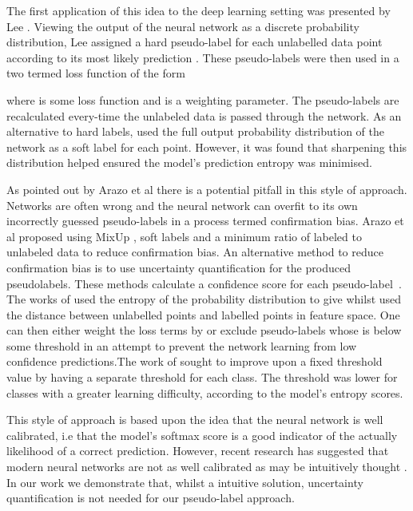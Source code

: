 \documentclass[journal]{IEEEtran}
\begin{document}
The first application of this idea to the deep learning setting was presented by Lee \cite{lee2013pseudo}. Viewing the output of the neural network  as a discrete probability distribution, Lee assigned a hard pseudo-label  for each unlabelled data point according to its most likely prediction . These pseudo-labels were then used in a two termed loss function of the form 

\vspace{-0.4cm}


\noindent
where  is some loss function and  is a weighting parameter. The pseudo-labels are recalculated every-time the unlabeled data is passed through the network. As an alternative to hard labels, \cite{berthelot2019mixmatch} used the full output probability distribution of the network as a soft label for each point. However, it was found that sharpening this distribution helped ensured the model's prediction entropy was minimised. 

As pointed out by Arazo et al \cite{arazo2019pseudo} there is a potential pitfall in this style of approach. Networks are often wrong and the neural network can overfit to its own incorrectly guessed pseudo-labels in a process termed confirmation bias. Arazo et al proposed using MixUp \cite{zhang2017mixup}, soft labels and a minimum ratio of labeled to unlabeled data to reduce confirmation bias. An alternative method to reduce confirmation bias is to use uncertainty quantification for the produced pseudolabels. These methods calculate a confidence score  for each pseudo-label~. The works of  \cite{sohn2020fixmatch,iscen2019label,hu2021simple} used the entropy of the probability distribution to give  whilst \cite{shi2018transductive} used the distance between unlabelled points and labelled points in feature space. One can then either weight the loss terms by  or exclude pseudo-labels whose  is below some threshold  in an attempt to prevent the network learning from low confidence predictions.The work of \cite{zhang2021flexmatch} sought to improve upon a fixed threshold value by having a separate threshold for each class. The threshold was lower for classes with a greater learning difficulty, according to the model's entropy scores.

This style of approach is based upon the idea that the neural network is well calibrated, i.e that the model's softmax score is a good indicator of the actually likelihood of a correct prediction. However, recent research has suggested that modern neural networks are not as well calibrated as may be intuitively thought \cite{calibration}. In our work we demonstrate that, whilst a intuitive solution, uncertainty quantification is not needed for our pseudo-label approach. 
\end{document}

